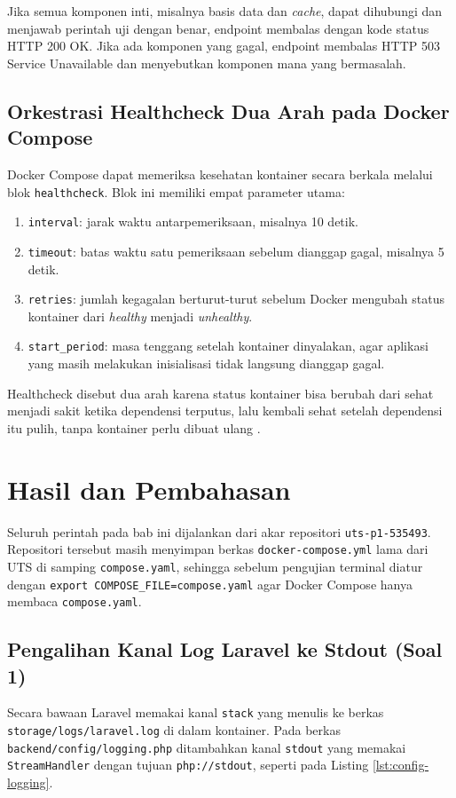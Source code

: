 \documentclass[a4paper,oneside,12pt]{report}
\newcommand{\tocboldsection}[1]{%
  \protect\renewcommand{\protect\cftchapfont}{\protect\bfseries}%
  #1%
  \protect\renewcommand{\protect\cftchapfont}{}%
}
\begin{document}
Jika semua komponen inti, misalnya basis data dan \textit{cache}, dapat dihubungi dan menjawab perintah uji dengan benar, endpoint membalas dengan kode status HTTP 200 OK. Jika ada komponen yang gagal, endpoint membalas HTTP 503 Service Unavailable dan menyebutkan komponen mana yang bermasalah.

\section{Orkestrasi Healthcheck Dua Arah pada Docker Compose}
Docker Compose dapat memeriksa kesehatan kontainer secara berkala melalui blok \texttt{healthcheck}. Blok ini memiliki empat parameter utama:
\begin{enumerate}
    \item \texttt{interval}: jarak waktu antarpemeriksaan, misalnya 10 detik.
    \item \texttt{timeout}: batas waktu satu pemeriksaan sebelum dianggap gagal, misalnya 5 detik.
    \item \texttt{retries}: jumlah kegagalan berturut-turut sebelum Docker mengubah status kontainer dari \textit{healthy} menjadi \textit{unhealthy}.
    \item \texttt{start\_period}: masa tenggang setelah kontainer dinyalakan, agar aplikasi yang masih melakukan inisialisasi tidak langsung dianggap gagal.
\end{enumerate}
Healthcheck disebut dua arah karena status kontainer bisa berubah dari sehat menjadi sakit ketika dependensi terputus, lalu kembali sehat setelah dependensi itu pulih, tanpa kontainer perlu dibuat ulang \cite{docker-compose-spec}.

\clearpage

\chapter[\texorpdfstring{\tocboldsection{Hasil dan Pembahasan}}{Hasil dan Pembahasan}]{Hasil dan Pembahasan}

Seluruh perintah pada bab ini dijalankan dari akar repositori \texttt{uts-p1-535493}. Repositori tersebut masih menyimpan berkas \texttt{docker-compose.yml} lama dari UTS di samping \texttt{compose.yaml}, sehingga sebelum pengujian terminal diatur dengan \texttt{export COMPOSE\_FILE=compose.yaml} agar Docker Compose hanya membaca \texttt{compose.yaml}.

\section{Pengalihan Kanal Log Laravel ke Stdout (Soal 1)}
Secara bawaan Laravel memakai kanal \texttt{stack} yang menulis ke berkas \texttt{storage/logs/laravel.log} di dalam kontainer. Pada berkas \texttt{backend/config/logging.php} ditambahkan kanal \texttt{stdout} yang memakai \texttt{StreamHandler} dengan tujuan \texttt{php://stdout}, seperti pada Listing \ref{lst:config-logging}.
\end{document}
